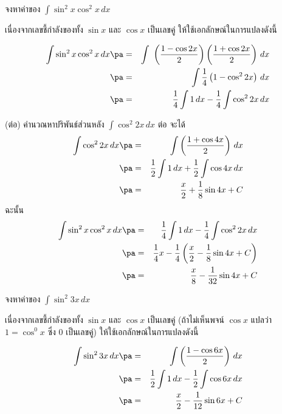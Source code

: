 \begin{frame}[t]
\begin{ex}
จงหาค่าของ $ \int \sin^2 x \cos^2 x \, dx$ \pa
\end{ex}

\begin{sol}
เนื่องจากเลขชี้กำลังของทั้ง $\sin x$ และ $\cos x$ เป็นเลขคู่ ให้ใช้เอกลักษณ์ในการแปลงดังนี้ \pa

\begin{eqnarray*}
\int \sin^2 x \cos^2 x \, dx \pa &=& \int\ \left( \frac{1-\cos 2x}{2} \right) \left( \frac{1+\cos 2x}{2} \right) \, dx \\
\pa &=& \int \frac{1}{4} \left(1 - \cos^2 2x \right) \, dx \\
\pa &=& \frac{1}{4} \int 1 \, dx - \frac{1}{4} \int \cos^2 2x \, dx 
\end{eqnarray*}
\end{sol}
\end{frame}

\begin{frame}[t]
\begin{sol} (ต่อ)
คำนวณหาปริพันธ์ส่วนหลัง $\int \cos^2 2x \, dx $ ต่อ จะได้
\begin{eqnarray*}
\int \cos^2 2x \, dx \pa &=& \int \left( \frac{1+\cos 4x}{2} \right)\, dx \\
\pa &=& \frac{1}{2} \int 1 \, dx + \frac{1}{2} \int \cos 4x \, dx \\
\pa &=& \frac{x}{2} + \frac{1}{8} \sin 4x + C
\end{eqnarray*}
ฉะนั้น
\begin{eqnarray*}
\int \sin^2 x \cos^2 x \, dx \pa &=&\frac{1}{4} \int 1 \, dx - \frac{1}{4} \int \cos^2 2x \, dx  \\
\pa &=& \frac{1}{4} x - \frac{1}{4} \left( \frac{x}{2} - \frac{1}{8} \sin 4x + C \right) \\
\pa &=& \frac{x}{8} - \frac{1}{32} \sin 4x + C
\end{eqnarray*}
\end{sol}
\end{frame}

\begin{frame}[t]
\begin{ex}
จงหาค่าของ $ \int \sin^2 3x \, dx$ \pa
\end{ex}
\begin{sol}
เนื่องจากเลขชี้กำลังของทั้ง $\sin x$ และ $\cos x$ เป็นเลขคู่ \pa (ถ้าไม่เห็นพจน์ $\cos x$ แปลว่า $1 = \cos^0 x$ ซึ่ง $0$ เป็นเลขคู่) \pa ให้ใช้เอกลักษณ์ในการแปลงดังนี้

\begin{eqnarray*}
\int \sin^2 3x \, dx \pa &=& \int \left( \frac{1-\cos 6x}{2} \right) \, dx \\
\pa &=& \frac{1}{2} \int 1 \, dx - \frac{1}{2} \int \cos 6x \, dx \\
\pa &=& \frac{x}{2} - \frac{1}{12} \sin 6x + C
\end{eqnarray*}
\end{sol}
\end{frame}


